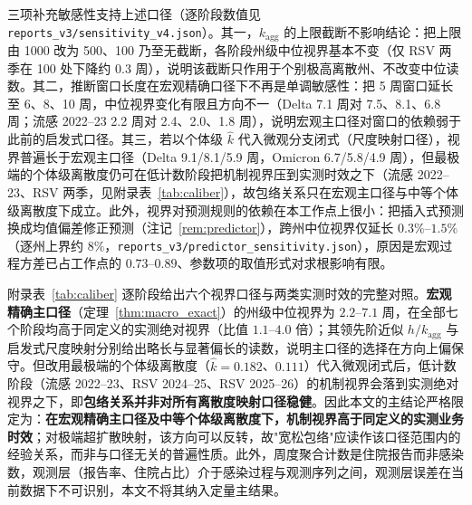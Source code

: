 \documentclass[10pt,a4paper]{article}
\theoremstyle{plain}
\theoremstyle{definition}
\begin{document}
三项补充敏感性支持上述口径（逐阶段数值见 \texttt{reports\_v3/sensitivity\_v4.json}）。其一，$k_{\text{agg}}$ 的上限截断不影响结论：把上限由 1000 改为 500、100 乃至无截断，各阶段州级中位视界基本不变（仅 RSV 两季在 100 处下降约 0.3 周），说明该截断只作用于个别极高离散州、不改变中位读数。其二，推断窗口长度在宏观精确口径下不再是单调敏感性：把 5 周窗口延长至 6、8、10 周，中位视界变化有限且方向不一（Delta 7.1 周对 7.5、8.1、6.8 周；流感 2022--23 2.2 周对 2.4、2.0、1.8 周），说明宏观主口径对窗口的依赖弱于此前的启发式口径。其三，若以个体级 $\hat k$ 代入微观分支闭式（尺度映射口径），视界普遍长于宏观主口径（Delta 9.1/8.1/5.9 周，Omicron 6.7/5.8/4.9 周），但最极端的个体级离散度仍可在低计数阶段把机制视界压到实测时效之下（流感 2022--23、RSV 两季，见附录表~\ref{tab:caliber}），故包络关系只在宏观主口径与中等个体级离散度下成立。此外，视界对预测规则的依赖在本工作点上很小：把插入式预测换成均值偏差修正预测（注记~\ref{rem:predictor}），跨州中位视界仅延长 $0.3\%$--$1.5\%$（逐州上界约 $8\%$，\texttt{reports\_v3/predictor\_sensitivity.json}），原因是宏观过程方差已占工作点的 $0.73$--$0.89$、参数项的取值形式对求根影响有限。

附录表~\ref{tab:caliber} 逐阶段给出六个视界口径与两类实测时效的完整对照。\textbf{宏观精确主口径}（定理~\ref{thm:macro_exact}）的州级中位视界为 $2.2$--$7.1$ 周，在全部七个阶段均高于同定义的实测绝对视界（比值 $1.1$--$4.0$ 倍）；其领先阶近似 $h/k_{\text{agg}}$ 与启发式尺度映射分别给出略长与显著偏长的读数，说明主口径的选择在方向上偏保守。但改用最极端的个体级离散度（$\hat k = 0.182$、$0.111$）代入微观闭式后，低计数阶段（流感 2022--23、RSV 2024--25、RSV 2025--26）的机制视界会落到实测绝对视界之下，即\textbf{包络关系并非对所有离散度映射口径稳健}。因此本文的主结论严格限定为：\textbf{在宏观精确主口径及中等个体级离散度下，机制视界高于同定义的实测业务时效}；对极端超扩散映射，该方向可以反转，故"宽松包络"应读作该口径范围内的经验关系，而非与口径无关的普遍性质。此外，周度聚合计数是住院报告而非感染数，观测层（报告率、住院占比）介于感染过程与观测序列之间，观测层误差在当前数据下不可识别，本文不将其纳入定量主结果。

\end{document}

